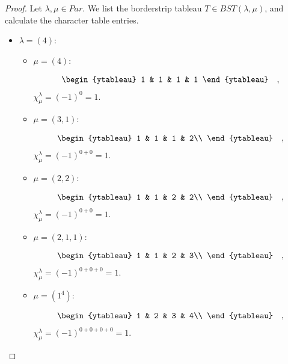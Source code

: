 \documentclass[8pt]{extarticle}
\newcommand{\<}{\langle}
\renewcommand{\>}{\rangle}
\theoremstyle{definition}
\begin{document}
\begin{proof}
  Let $\lambda, \mu \in Par$. We list the borderstrip tableau $T \in BST(\lambda, \mu)$, and calculate the character table entries.

  \begin{itemize}
  \item
    $\lambda=(4)$:
    \begin{itemize}
    \item
      $\mu = (4)$:
      
      \begin{align*}
        \begin{ytableau}
          1 & 1 & 1 & 1
        \end{ytableau}\quad,
      \end{align*}
      $\chi_{\mu}^{\lambda} = (-1)^0 = 1$.

    \item
      $\mu = (3,1)$:

      \begin{align*}
        \begin{ytableau}
          1 & 1 & 1 & 2\\
        \end{ytableau}\quad,
      \end{align*}
      $\chi_{\mu}^{\lambda} = (-1)^{0+0} = 1$.

    \item
      $\mu = (2,2)$:

      \begin{align*}
        \begin{ytableau}
          1 & 1 & 2 & 2\\
        \end{ytableau}\quad,
      \end{align*}
      $\chi_{\mu}^{\lambda} = (-1)^{0+0} = 1$.    

    \item
      $\mu = (2,1,1)$:

      \begin{align*}
        \begin{ytableau}
          1 & 1 & 2 & 3\\
        \end{ytableau}\quad,
      \end{align*}
      $\chi_{\mu}^{\lambda} = (-1)^{0+0+0} = 1$.

    \item
      $\mu = (1^4)$:

      \begin{align*}
        \begin{ytableau}
          1 & 2 & 3 & 4\\
        \end{ytableau}\quad,
      \end{align*}
      $\chi_{\mu}^{\lambda} = (-1)^{0+0+0+0} = 1$.
    \end{itemize}
    

\end{itemize}
\end{proof}
\end{document}
